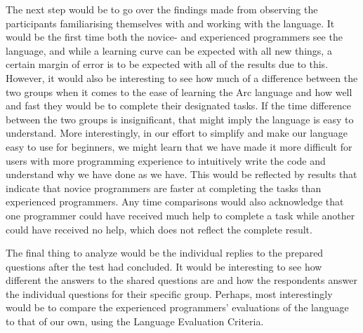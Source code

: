 The next step would be to go over the findings made from observing the participants familiarising themselves with and working with the language. It would be the first time both the novice- and experienced programmers see the language, and while a learning curve can be expected with all new things, a certain margin of error is to be expected with all of the results due to this. However, it would also be interesting to see how much of a difference between the two groups when it comes to the ease of learning the Arc language and how well and fast they would be to complete their designated tasks. If the time difference between the two groups is insignificant, that might imply the language is easy to understand. More interestingly, in our effort to simplify and make our language easy to use for beginners, we might learn that we have made it more difficult for users with more programming experience to intuitively write the code and understand why we have done as we have. This would be reflected by results that indicate that novice programmers are faster at completing the tasks than experienced programmers. Any time comparisons would also acknowledge that one programmer could have received much help to complete a task while another could have received no help, which does not reflect the complete result.

The final thing to analyze would be the individual replies to the prepared questions after the test had concluded. It would be interesting to see how different the answers to the shared questions are and how the respondents answer the individual questions for their specific group. Perhaps, most interestingly would be to compare the experienced programmers' evaluations of the language to that of our own, using the Language Evaluation Criteria.